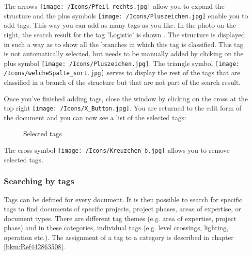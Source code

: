 The arrows \texttt{[image: /Icons/Pfeil\_rechts.jpg]} allow you to expand the structure and the plus symbols \texttt{[image: /Icons/Pluszeichen.jpg]} enable you to add tags. This way you can add as many tags as you like. In the photo on the right, the search result for the tag 'Logistic' is shown . The structure is displayed in such a way as to show all the branches in which this tag is classified. This tag is not automatically selected, but needs to be manually added by clicking on the plus symbol \texttt{[image: /Icons/Pluszeichen.jpg]}. The triangle symbol \texttt{[image: /Icons/welcheSpalte\_sort.jpg]} serves to display the rest of the tags that are classified in a branch of the structure but that are not part of the search result. \newline

Once you've finished adding tags, close the window by clicking on the cross at the top right \texttt{[image: /Icons/X\_Button.jpg]}. You are returned to the edit form of the document and you can now see a list of the selected tags:

\begin{figure}[H]
\caption{Selected tags}
\end{figure}

The cross symbol \texttt{[image: /Icons/Kreuzchen\_b.jpg]}  allows you to remove selected tags.




\subsubsection{Searching by tags}
\label{bkm:Ref442275849}

Tags can be defined for every document. It is then possible to search for specific tags to find documents of specific projects, project phases, areas of expertise, or document types. There are different tag themes (e.g. area of expertise, project phase) and in these categories, individual tags (e.g. level crossings, lighting, operation etc.). The assignment of a tag to a category is described in chapter \ref{bkm:Ref442863508}.

